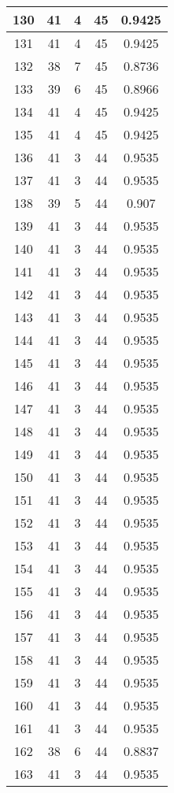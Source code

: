 \documentclass[letterpaper, 12pt]{article}
\begin{document}
\begin{longtable}{|c|c|c|c|c|}
\hline
130 & 41 & 4 & 45 & 0.9425 \\
\hline
131 & 41 & 4 & 45 & 0.9425 \\
\hline
132 & 38 & 7 & 45 & 0.8736 \\
\hline
133 & 39 & 6 & 45 & 0.8966 \\
\hline
134 & 41 & 4 & 45 & 0.9425 \\
\hline
135 & 41 & 4 & 45 & 0.9425 \\
\hline
136 & 41 & 3 & 44 & 0.9535 \\
\hline
137 & 41 & 3 & 44 & 0.9535 \\
\hline
138 & 39 & 5 & 44 & 0.907 \\
\hline
139 & 41 & 3 & 44 & 0.9535 \\
\hline
140 & 41 & 3 & 44 & 0.9535 \\
\hline
141 & 41 & 3 & 44 & 0.9535 \\
\hline
142 & 41 & 3 & 44 & 0.9535 \\
\hline
143 & 41 & 3 & 44 & 0.9535 \\
\hline
144 & 41 & 3 & 44 & 0.9535 \\
\hline
145 & 41 & 3 & 44 & 0.9535 \\
\hline
146 & 41 & 3 & 44 & 0.9535 \\
\hline
147 & 41 & 3 & 44 & 0.9535 \\
\hline
148 & 41 & 3 & 44 & 0.9535 \\
\hline
149 & 41 & 3 & 44 & 0.9535 \\
\hline
150 & 41 & 3 & 44 & 0.9535 \\
\hline
151 & 41 & 3 & 44 & 0.9535 \\
\hline
152 & 41 & 3 & 44 & 0.9535 \\
\hline
153 & 41 & 3 & 44 & 0.9535 \\
\hline
154 & 41 & 3 & 44 & 0.9535 \\
\hline
155 & 41 & 3 & 44 & 0.9535 \\
\hline
156 & 41 & 3 & 44 & 0.9535 \\
\hline
157 & 41 & 3 & 44 & 0.9535 \\
\hline
158 & 41 & 3 & 44 & 0.9535 \\
\hline
159 & 41 & 3 & 44 & 0.9535 \\
\hline
160 & 41 & 3 & 44 & 0.9535 \\
\hline
161 & 41 & 3 & 44 & 0.9535 \\
\hline
162 & 38 & 6 & 44 & 0.8837 \\
\hline
163 & 41 & 3 & 44 & 0.9535 \\

\end{longtable}
\end{document}
